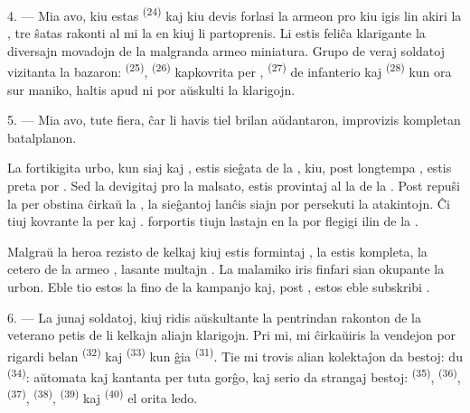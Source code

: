 \VUsaut{4.0mm}
\VUsaut{2.8mm}

4. --- Mia avo, kiu estas  \textsuperscript{(24)} kaj kiu devis
forlasi la armeon pro  kiu igis lin akiri la , tre ŝatas rakonti al mi la  en kiuj li
partoprenis. Li estis feliĉa klarigante la diversajn movadojn de la malgranda
armeo miniatura. Grupo de veraj soldatoj vizitanta la bazaron:  \textsuperscript{(25)},  \textsuperscript{(26)}
kapkovrita per ,  \textsuperscript{(27)} de
infanterio kaj  \textsuperscript{(28)} kun ora
 sur maniko, haltis apud ni por aŭskulti la klarigojn.

5. --- Mia avo, tute fiera, ĉar li havis tiel brilan aŭdantaron, improvizis
kompletan batalplanon.

La fortikigita urbo, kun siaj  kaj , estis
sieĝata de la , kiu, post longtempa ,
estis preta por . Sed la  devigitaj pro la
malsato, estis provintaj  al la  de la
. Post repuŝi la  per obstina 
ĉirkaŭ la , la  sieĝantoj lanĉis siajn
 por persekuti la  atakintojn. Ĉi tiuj
 kovrante la  per  kaj
.  forportis tiujn lastajn en la
 por flegigi ilin de la .

Malgraŭ la heroa rezisto de kelkaj  kiuj estis formintaj
, la  estis kompleta, la cetero de la armeo
, lasante multajn . La malamiko iris
finfari sian  okupante la urbon. Eble tio estos la fino de la
kampanjo kaj, post , estos eble subskribi
.

\VUsaut{4.4mm}
\VUsaut{2.8mm}

6. --- La junaj soldatoj, kiuj ridis aŭskultante la pentrindan rakonton de la
veterano petis de li kelkajn aliajn klarigojn. Pri mi, mi ĉirkaŭiris la
vendejon por rigardi belan  \textsuperscript{(32)} kaj
 \textsuperscript{(33)} kun ĝia 
\textsuperscript{(31)}. Tie mi trovis alian kolektaĵon da bestoj: du
 \textsuperscript{(34)}: aŭtomata 
kaj  kantanta per tuta gorĝo, kaj serio da strangaj bestoj:
 \textsuperscript{(35)},  \textsuperscript{(36)},
 \textsuperscript{(37)},  \textsuperscript{(38)},
 \textsuperscript{(39)} kaj 
\textsuperscript{(40)} el orita ledo.

